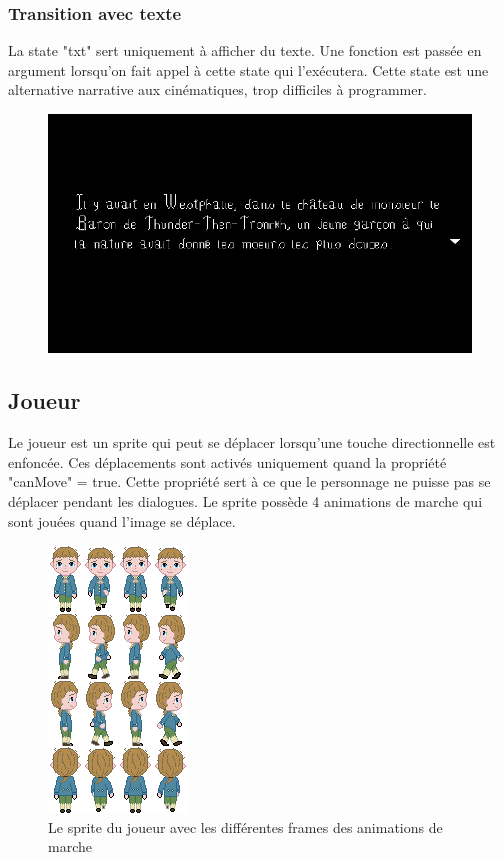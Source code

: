 \documentclass[11pt]{article}
\begin{document}
\begin{appendices}
\subsubsection{Transition avec texte}
La state "txt" sert uniquement à afficher du texte. Une fonction est passée en argument lorsqu'on fait appel à cette state qui l'exécutera. Cette state est une alternative narrative aux cinématiques, trop difficiles à programmer.
\begin{figure}[H]
\includegraphics[scale=0.33]{introScreen}
\centering
\end{figure}  
\subsection{Joueur}
Le joueur est un sprite qui peut se déplacer lorsqu'une touche directionnelle est enfoncée. Ces déplacements sont activés uniquement quand la propriété "canMove" = true. Cette propriété sert à ce que le personnage ne puisse pas se déplacer pendant les dialogues. Le sprite possède 4 animations de marche qui sont jouées quand l'image se déplace.\\
\begin{figure}[H]
\includegraphics[scale=0.5]{candideSprite}
\centering
\caption{Le sprite du joueur avec les différentes frames des animations de marche}
\end{figure}



\end{appendices}
\end{document}
